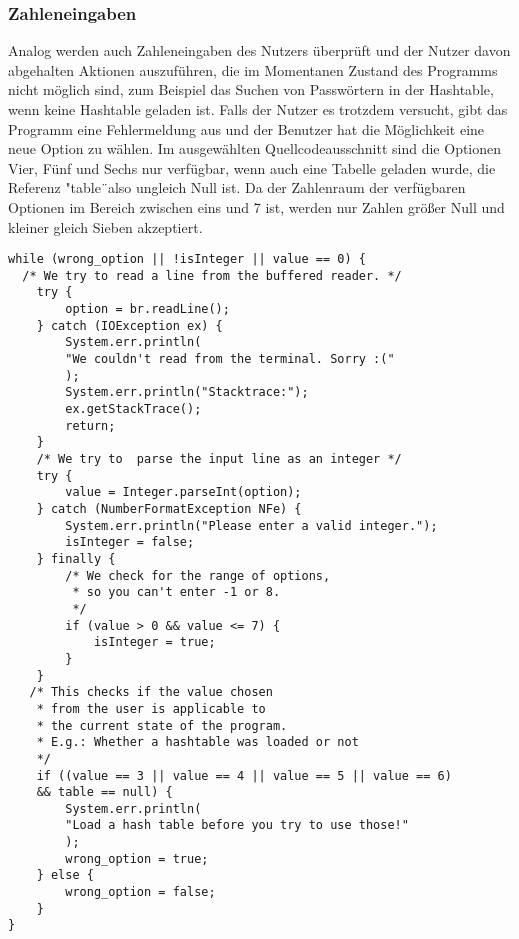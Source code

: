 \documentclass[11pt]{article}
\begin{document}
  \subsubsection{Zahleneingaben}
Analog werden auch Zahleneingaben des Nutzers überprüft und der Nutzer davon abgehalten Aktionen auszuführen, die im Momentanen Zustand des Programms nicht möglich sind, zum Beispiel das Suchen von Passwörtern in der Hashtable, wenn keine Hashtable geladen ist.
 Falls der Nutzer es trotzdem versucht, gibt das Programm eine Fehlermeldung aus und der Benutzer hat die Möglichkeit eine neue Option zu wählen.
Im ausgewählten Quellcodeausschnitt sind die Optionen Vier, Fünf und Sechs nur verfügbar, wenn auch eine Tabelle geladen wurde, die Referenz "table\"\ also ungleich Null ist. Da der Zahlenraum der verfügbaren Optionen im Bereich zwischen eins und 7 ist, werden nur Zahlen größer Null und kleiner gleich Sieben akzeptiert.\\
\begin{lstlisting}[caption=Überprüfung von Zahlen, label=lst:checkIntegers]
while (wrong_option || !isInteger || value == 0) {
  /* We try to read a line from the buffered reader. */
	try {
		option = br.readLine();
	} catch (IOException ex) {
		System.err.println(
		"We couldn't read from the terminal. Sorry :("
		);
		System.err.println("Stacktrace:");
		ex.getStackTrace();
		return;
	}
    /* We try to  parse the input line as an integer */
    try {
    	value = Integer.parseInt(option);
    } catch (NumberFormatException NFe) {
    	System.err.println("Please enter a valid integer.");
        isInteger = false;
    } finally {
		/* We check for the range of options, 
		 * so you can't enter -1 or 8. 
		 */
		if (value > 0 && value <= 7) {
			isInteger = true;
    	}
   	}
   /* This checks if the value chosen 
    * from the user is applicable to 
    * the current state of the program.
    * E.g.: Whether a hashtable was loaded or not 
    */
    if ((value == 3 || value == 4 || value == 5 || value == 6) 
    && table == null) {
    	System.err.println(
    	"Load a hash table before you try to use those!"
    	);
    	wrong_option = true;
	} else {
    	wrong_option = false;
    }
}
  \end{lstlisting}
\end{document}
